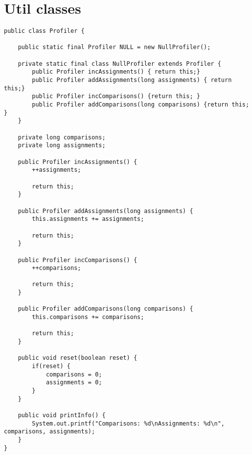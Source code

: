 \chapter{Util classes}
\lstset{language=Java}
\begin{lstlisting}[caption=Util classes Source code - Profiler]
public class Profiler {

	public static final Profiler NULL = new NullProfiler();
	
	private static final class NullProfiler extends Profiler {
		public Profiler incAssignments() { return this;}
		public Profiler addAssignments(long assignments) { return this;}
		public Profiler incComparisons() {return this; }
		public Profiler addComparisons(long comparisons) {return this; }
	}
	
	private long comparisons;
	private long assignments;
	
	public Profiler incAssignments() {
		++assignments;
		
		return this;
	}
	
	public Profiler addAssignments(long assignments) {
		this.assignments += assignments;
		
		return this;
	}
	
	public Profiler incComparisons() {
		++comparisons;
		
		return this;
	}
	
	public Profiler addComparisons(long comparisons) {
		this.comparisons += comparisons;
		
		return this;
	}
	
	public void reset(boolean reset) {
		if(reset) {
			comparisons = 0;
			assignments = 0;
		}
	}

	public void printInfo() {
		System.out.printf("Comparisons: %d\nAssignments: %d\n", comparisons, assignments);
	}
}
\end{lstlisting}

